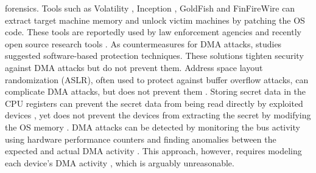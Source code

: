 forensics. Tools such as Volatility \cite{Vol}, Inception \cite{MM}, GoldFish \cite{GA10} and FinFireWire \cite{Fin14} can extract target machine memory and unlock victim machines by patching the OS code. These tools are reportedly used by law enforcement agencies and recently open source research tools \cite{thunder}. As countermeasures for DMA attacks, studies suggested software-based protection techniques. These solutions tighten security against DMA attacks but do not prevent them. Address space layout randomization (ASLR), often used to protect against buffer overflow attacks, can complicate DMA attacks, but does not prevent them \cite{SB12}. Storing secret data in the CPU registers can prevent the secret data from being read directly by exploited devices \cite{MFD11, CZG15, Sim11}, yet does not prevent the devices from extracting the secret by modifying the OS memory \cite{BR12}. DMA attacks can be detected by monitoring the bus activity using hardware performance counters and finding anomalies between the expected and actual DMA activity \cite{Ste13}. This approach, however, requires modeling each device’s DMA activity \cite{Ste14}, which is arguably unreasonable.

